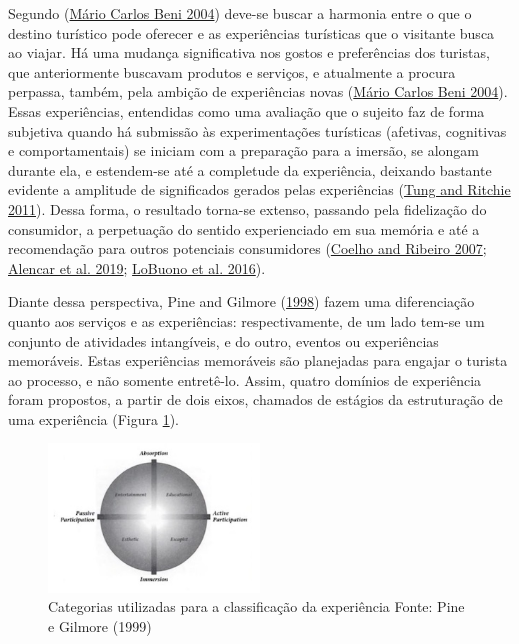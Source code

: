 \documentclass[preprint, 3p,
authoryear]{elsarticle} %
\begin{document}
Segundo (\protect\hyperlink{ref-Beni2004}{Mário Carlos Beni 2004})
deve-se buscar a harmonia entre o que o destino turístico pode oferecer
e as experiências turísticas que o visitante busca ao viajar. Há uma
mudança significativa nos gostos e preferências dos turistas, que
anteriormente buscavam produtos e serviços, e atualmente a procura
perpassa, também, pela ambição de experiências novas
(\protect\hyperlink{ref-Beni2004}{Mário Carlos Beni 2004}). Essas
experiências, entendidas como uma avaliação que o sujeito faz de forma
subjetiva quando há submissão às experimentações turísticas (afetivas,
cognitivas e comportamentais) se iniciam com a preparação para a
imersão, se alongam durante ela, e estendem-se até a completude da
experiência, deixando bastante evidente a amplitude de significados
gerados pelas experiências (\protect\hyperlink{ref-Tung2011}{Tung and
Ritchie 2011}). Dessa forma, o resultado torna-se extenso, passando pela
fidelização do consumidor, a perpetuação do sentido experienciado em sua
memória e até a recomendação para outros potenciais consumidores
(\protect\hyperlink{ref-Coelho2007}{Coelho and Ribeiro 2007};
\protect\hyperlink{ref-Alencar2019}{Alencar et al. 2019};
\protect\hyperlink{ref-LoBuono2016}{LoBuono et al. 2016}).

Diante dessa perspectiva, Pine and Gilmore
(\protect\hyperlink{ref-pine1999}{1998}) fazem uma diferenciação quanto
aos serviços e as experiências: respectivamente, de um lado tem-se um
conjunto de atividades intangíveis, e do outro, eventos ou experiências
memoráveis. Estas experiências memoráveis são planejadas para engajar o
turista ao processo, e não somente entretê-lo. Assim, quatro domínios de
experiência foram propostos, a partir de dois eixos, chamados de
estágios da estruturação de uma experiência (Figura \ref{fig:figura1}).

\begin{figure}[H]
  \centering
  \includegraphics[width=0.5\textwidth]{./fig1.jpeg}
  \caption{Categorias utilizadas para a classificação da experiência Fonte: Pine e Gilmore (1999)}
  \label{fig:figura1}
\end{figure}
\end{document}
